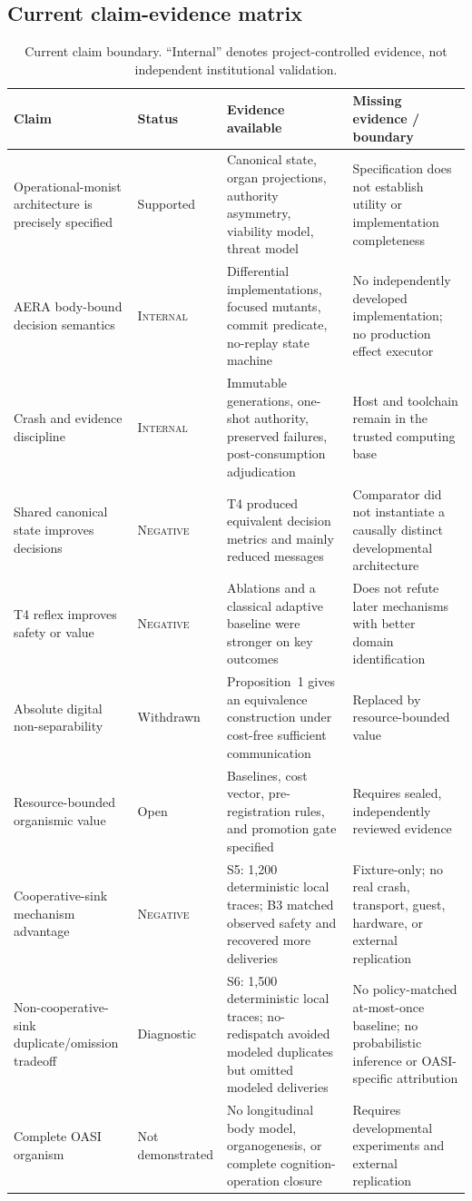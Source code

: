 \documentclass[journal,10pt]{IEEEtran}
\newcommand{\OASI}{\textsc{OASI}}
\newcommand{\AERA}{\textsc{AERA}}
\newcommand{\Internal}{\textsc{Internal}}
\newcommand{\Negative}{\textsc{Negative}}
\begin{document}
\subsection{Current claim-evidence matrix}
\begin{table}[t]
\centering
\caption{Current claim boundary. ``Internal'' denotes project-controlled evidence, not independent institutional validation.}
\label{tab:claims}
\small
\begin{tabularx}{\textwidth}{@{}p{3.15cm}p{1.55cm}X X@{}}
\toprule
Claim & Status & Evidence available & Missing evidence / boundary \\
\midrule
Operational-monist architecture is precisely specified & Supported & Canonical state, organ projections, authority asymmetry, viability model, threat model & Specification does not establish utility or implementation completeness \\
\AERA{} body-bound decision semantics & \Internal{} & Differential implementations, focused mutants, commit predicate, no-replay state machine & No independently developed implementation; no production effect executor \\
Crash and evidence discipline & \Internal{} & Immutable generations, one-shot authority, preserved failures, post-consumption adjudication & Host and toolchain remain in the trusted computing base \\
Shared canonical state improves decisions & \Negative{} & T4 produced equivalent decision metrics and mainly reduced messages & Comparator did not instantiate a causally distinct developmental architecture \\
T4 reflex improves safety or value & \Negative{} & Ablations and a classical adaptive baseline were stronger on key outcomes & Does not refute later mechanisms with better domain identification \\
Absolute digital non-separability & Withdrawn & Proposition~1 gives an equivalence construction under cost-free sufficient communication & Replaced by resource-bounded value \\
Resource-bounded organismic value & Open & Baselines, cost vector, pre-registration rules, and promotion gate specified & Requires sealed, independently reviewed evidence \\
Cooperative-sink mechanism advantage & \Negative{} & S5: 1,200 deterministic local traces; B3 matched observed safety and recovered more deliveries & Fixture-only; no real crash, transport, guest, hardware, or external replication \\
Non-cooperative-sink duplicate/omission tradeoff & Diagnostic & S6: 1,500 deterministic local traces; no-redispatch avoided modeled duplicates but omitted modeled deliveries & No policy-matched at-most-once baseline; no probabilistic inference or OASI-specific attribution \\
Complete \OASI{} organism & Not demonstrated & No longitudinal body model, organogenesis, or complete cognition-operation closure & Requires developmental experiments and external replication \\
\bottomrule
\end{tabularx}
\end{table}
\end{document}
